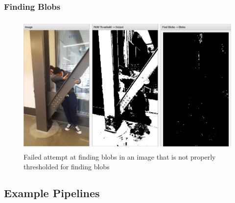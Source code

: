 \documentclass[../main.tex]{subfiles}
\begin{document}
\subsubsection{Finding Blobs}
\begin{figure}[H]
    \centering
    \includegraphics[height=200pt]{sections/vision/images/opencv/crawley/crawleyBlob.png}
    \caption{Failed attempt at finding blobs in an image that is not properly thresholded for finding blobs}
\end{figure}
\subsection{Example Pipelines}
\end{document}
